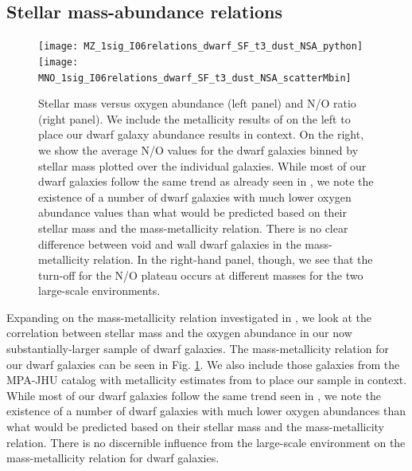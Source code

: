 \subsection{Stellar mass-abundance relations}\label{sec:Mass}

\begin{figure}
    \centering
    \texttt{[image: MZ\_1sig\_I06relations\_dwarf\_SF\_t3\_dust\_NSA\_python]}
    \texttt{[image: MNO\_1sig\_I06relations\_dwarf\_SF\_t3\_dust\_NSA\_scatterMbin]}
    \caption{Stellar mass versus oxygen abundance (left panel) and N/O ratio 
    (right panel).  We include the metallicity results of \cite{Tremonti04} on 
    the left to place our dwarf galaxy abundance results in context.  On the 
    right, we show the average N/O values for the dwarf galaxies binned by 
    stellar mass plotted over the individual galaxies.  While most of our dwarf 
    galaxies follow the same trend as already seen in \cite{Tremonti04}, we note 
    the existence of a number of dwarf galaxies with much lower oxygen abundance 
    values than what would be predicted based on their stellar mass and the 
    mass-metallicity relation.  There is no clear difference between void and 
    wall dwarf galaxies in the mass-metallicity relation.  In the right-hand 
    panel, though, we see that the turn-off for the N/O plateau occurs at 
    different masses for the two large-scale environments.}
    \label{fig:M_NO}
\end{figure}

Expanding on the mass-metallicity relation investigated in \cite{Douglass17a}, 
we look at the correlation between stellar mass and the oxygen abundance in our 
now substantially-larger sample of dwarf galaxies.  The mass-metallicity 
relation for our dwarf galaxies can be seen in Fig. \ref{fig:M_NO}.  We also 
include those galaxies from the MPA-JHU catalog with metallicity estimates from 
\cite{Tremonti04} to place our sample in context.  While most of our dwarf 
galaxies follow the same trend seen in \cite{Tremonti04}, we note the existence 
of a number of dwarf galaxies with much lower oxygen abundances than what would 
be predicted based on their stellar mass and the mass-metallicity relation.  
There is no discernible influence from the large-scale environment on the 
mass-metallicity relation for dwarf galaxies.

